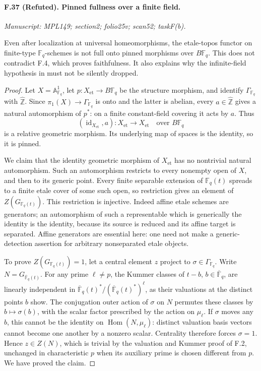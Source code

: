 \paragraph{F.37 (Refuted). Pinned fullness over a finite field.}
\textit{Manuscript: MPL149; section2; folio25v; scan52; taskF(b).}

Even after localization at universal homeomorphisms, the etale-topos
functor on finite-type $\mathbb F_q$-schemes is not full onto pinned
morphisms over $B\mathbb F_q$. This does not contradict F.4, which proves
faithfulness. It also explains why the infinite-field hypothesis in
\cite[Theorem~0.1]{CHW2024} must not be silently dropped.

\begin{proof}
Let $X=\mathbb A^1_{\mathbb F_q}$, let $p:X_{\mathrm{et}}\to
B\mathbb F_q$ be the structure morphism, and identify
$\Gamma_{\mathbb F_q}$ with $\widehat{\mathbb Z}$. Since
$\pi_1(X)\to\Gamma_{\mathbb F_q}$ is onto and the latter is abelian,
every $a\in\widehat{\mathbb Z}$ gives a natural automorphism of $p^*$:
on a finite constant-field covering it acts by $a$. Thus
\[
 (\operatorname{id}_{X_{\mathrm{et}}},a):
 X_{\mathrm{et}}\longrightarrow X_{\mathrm{et}}
 \quad\text{over }B\mathbb F_q
\]
is a relative geometric morphism. Its underlying map of spaces is the
identity, so it is pinned.

We claim that the identity geometric morphism of $X_{\mathrm{et}}$ has
no nontrivial natural automorphism. Such an automorphism restricts to
every nonempty open of $X$, and then to its generic point. Every finite
separable extension of $\mathbb F_q(t)$ spreads to a finite etale cover
of some such open, so restriction gives an element of
$Z(G_{\mathbb F_q(t)})$. This restriction is injective. Indeed affine
etale schemes are generators; an automorphism of such a representable
which is generically the identity is the identity, because its source
is reduced and its affine target is separated. Affine generators are
essential here: one need not make a generic-detection assertion for
arbitrary nonseparated etale objects.

To prove $Z(G_{\mathbb F_q(t)})=1$, let a central element $z$ project to
$\sigma\in\Gamma_{\mathbb F_q}$. Write
$N=G_{\overline{\mathbb F}_q(t)}$. For any prime $\ell\ne p$, the Kummer
classes of $t-b$, $b\in\overline{\mathbb F}_q$, are linearly independent
in $\overline{\mathbb F}_q(t)^*/(\overline{\mathbb F}_q(t)^*)^\ell$,
as their valuations at the distinct points $b$ show. The conjugation
outer action of $\sigma$ on $N$ permutes these classes by
$b\mapsto\sigma(b)$, with the scalar factor prescribed by the action
on $\mu_\ell$. If $\sigma$ moves any $b$, this cannot be the identity
on $\operatorname{Hom}(N,\mu_\ell)$: distinct valuation basis vectors
cannot become one another by a nonzero scalar. Centrality therefore
forces $\sigma=1$. Hence $z\in Z(N)$, which is trivial by the valuation
and Kummer proof of F.2, unchanged in characteristic $p$ when its auxiliary
prime is chosen different from $p$. We have proved the claim.


\end{proof}
